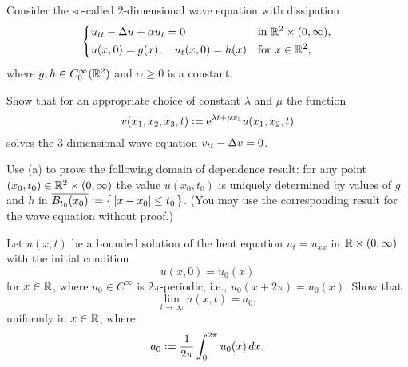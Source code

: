 \begin{problem}
  Consider the so-called \(2\)-dimensional wave equation with dissipation
  \[
    \left\{
      \begin{aligned}
        &u_{tt}-\Delta u+\alpha u_t=0&&\text{in \(\mathbb{R}^2\times(0,\infty)\),}\\
        &u(x,0)=g(x),\quad u_t(x,0)=h(x)&&\text{for \(x\in\mathbb{R}^2\),}
      \end{aligned}
    \right.
  \]
  where \(g,h\in C_0^\infty(\mathbb{R}^2)\) and \(\alpha\geq 0\) is a constant.
  \begin{alphlist}
  \item Show that for an appropriate choice of constant \(\lambda\)
    and \(\mu\) the function
    \[
      v(x_1,x_2,x_3,t)\defeq \rme^{\lambda t+\mu x_3}u(x_1,x_2,t)
    \]
    solves the \(3\)-dimensional wave equation \(v_{tt}-\Delta v=0\).
  \item Use (a) to prove the following domain of dependence result:
    for any point \((x_0,t_0)\in\mathbb{R}^2\times(0,\infty)\) the value
    \(u(x_0,t_0)\) is uniquely determined by values of \(g\) and \(h\) in
    \(\overline{B_{t_0}(x_0)}\defeq\{\,|x-x_0|\leq t_0\,\}\). (You may use
    the corresponding result for the wave equation without proof.)
  \end{alphlist}
\end{problem}
\begin{solution*}
\end{solution*}

\begin{problem}
  Let \(u(x,t)\) be a bounded solution of the heat equation \(u_t=u_{xx}\)
  in \(\mathbb{R}\times(0,\infty)\) with the initial condition
  \[
    u(x,0)=u_0(x)
  \]
  for \(x\in\mathbb{R}\), where \(u_0\in C^\infty\) is \(2\pi\)-periodic, i.e.,
  \(u_0(x+2\pi)=u_0(x)\). Show that
  \[
    \lim_{t\to\infty} u(x,t)=a_0,
  \]
  uniformly in \(x\in\mathbb{R}\), where
  \[
    a_0\defeq\frac{1}{2\pi}\int_0^{2\pi} u_0(x)\diff x.
  \]
\end{problem}
\begin{solution*}
\end{solution*}

